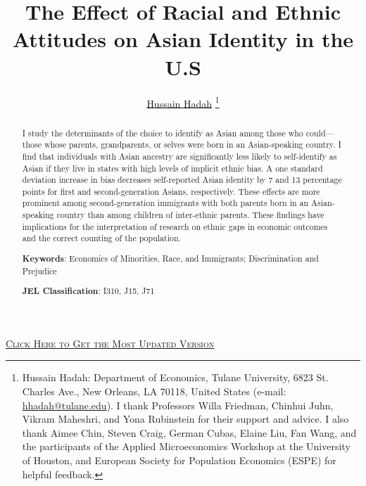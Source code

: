 \documentclass[12pt,english]{article}
\begin{document}
\title{The Effect of Racial and Ethnic Attitudes on Asian Identity in the U.S}

\author{\href{https://hussainhadah.com/}{Hussain Hadah} \thanks{Hussain Hadah: Department of Economics, Tulane University, 6823 St. Charles Ave., New Orleans, LA 70118, United States (e-mail: \href{mailto:hhadah@tulane.edu}{hhadah@tulane.edu}). I thank Professors Willa Friedman, Chinhui Juhn, Vikram Maheshri, and Yona Rubinstein for their support and advice. I also thank Aimee Chin, Steven Craig, German Cubas, Elaine Liu, Fan Wang, and the participants of the Applied Microeconomics Workshop at the University of Houston, and European Society for Population Economics (ESPE) for helpful feedback.}}


\maketitle

\begin{center}
\href{https://hhadah.github.io/Attitudes-and-Identity/my_paper/Hadah-Attitudes.pdf}{\textcolor{green!15!black!30!blue}{\footnotesize{\textsc{Click Here to Get the Most Updated Version}}}}
\end{center}

\begin{abstract}
I study the determinants of the choice to identify as Asian among those who could—those whose parents, grandparents, or selves were born in an Asian-speaking country. I find that individuals with Asian ancestry are significantly less likely to self-identify as Asian if they live in states with high levels of implicit ethnic bias. A one standard deviation increase in bias decreases self-reported Asian identity by 7 and 13 percentage points for first and second-generation Asians, respectively. These effects are more prominent among second-generation immigrants with both parents born in an Asian-speaking country than among children of inter-ethnic parents. These findings have implications for the interpretation of research on ethnic gaps in economic outcomes and the correct counting of the population.

\noindent\textbf{Keywords}: Economics of Minorities, Race, and Immigrants; Discrimination and Prejudice

\noindent\textbf{JEL Classification}: I310, J15, J71

\end{abstract}

\vfill
\pagebreak{}
\end{document}
